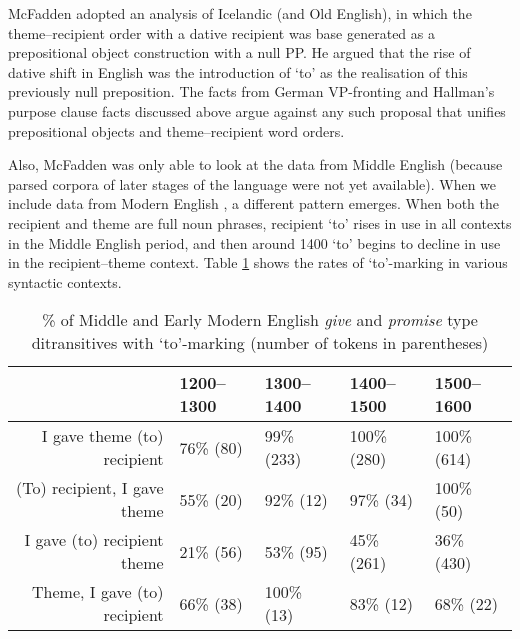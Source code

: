 McFadden adopted an analysis of Icelandic (and Old English), in which the theme--recipient order with a dative recipient was base generated as a prepositional object construction with a null PP. He argued that the rise of dative shift in English was the introduction of `to' as the realisation of this previously null preposition. The facts from German VP-fronting and Hallman's purpose clause facts discussed above argue against any such proposal that unifies prepositional objects and theme--recipient word orders.

Also, McFadden was only able to look at the data from Middle English (because parsed corpora of later stages of the language were not yet available). When we include data from Modern English \citep{Kroch.2004,Kroch.2010,Taylor.2006}, a different pattern emerges. When both the recipient and theme are full noun phrases, recipient `to' rises in use in all contexts in the Middle English period, and then around 1400 `to' begins to decline in use in the recipient--theme context. Table \ref{tab:britto} shows the rates of `to'-marking in various syntactic contexts.

\begin{table}[ht!]
\centering
\begin{tabular}{rllll}
  \hline
 & 1200--1300 & 1300--1400 & 1400--1500 & 1500--1600 \\ 
  \hline
I gave theme (to) recipient & 76\% (80) & 99\% (233) & 100\% (280) & 100\% (614) \\ 
  (To) recipient, I gave theme & 55\% (20) & 92\% (12) & 97\% (34) & 100\% (50) \\ 
  I gave (to) recipient theme & 21\% (56) & 53\% (95) & 45\% (261) & 36\% (430) \\ 
  Theme, I gave (to) recipient & 66\% (38) & 100\% (13) & 83\% (12) & 68\% (22) \\ 
   \hline
\end{tabular}
\caption{\% of Middle and Early Modern English \textit{give} and \textit{promise} type ditransitives with `to'-marking (number of tokens in parentheses)} 
\label{tab:britto}
\end{table}

